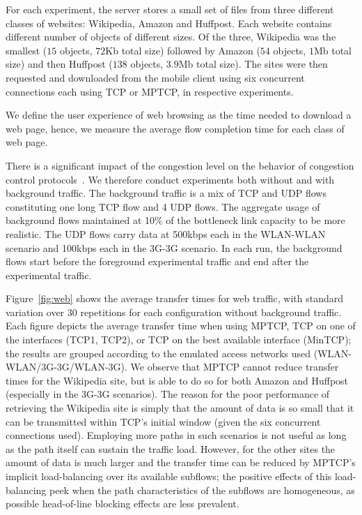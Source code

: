 For each experiment, the server stores a small set of files from three different classes
of websites: Wikipedia, Amazon and Huffpost. Each website contains different number of objects of different sizes. 
Of the three, Wikipedia was the smallest ($15$ objects, $72$Kb total size) followed by Amazon ($54$ objects, $1$Mb total size) 
and then Huffpost ($138$ objects, $3.9$Mb total size). The sites were then requested and downloaded from the mobile 
client using six concurrent connections each using TCP or MPTCP, in respective experiments.

We define the user experience of web browsing as the time needed to download a web page, hence, we measure the average flow completion time for each class of web page.

There is a significant impact of the congestion level on the behavior of congestion control protocols~\cite{ha-background-traffic-comnet-2007}. We therefore conduct
experiments both without and with background traffic.  The background traffic is a mix of TCP and UDP flows constituting one long TCP flow and 4 UDP flows. The
aggregate usage of background flows maintained at 10\% of the bottleneck link capacity to be more realistic. The UDP flows carry data at 500kbps each in the
WLAN-WLAN scenario and 100kbps each in the 3G-3G scenario.  In each run, the background flows start before the foreground experimental traffic and end after
the experimental traffic.


Figure~\ref{fig:web} shows the average transfer times for web traffic, with standard variation over $30$ repetitions for 
each configuration without background traffic. Each figure depicts the average transfer time when using MPTCP, 
TCP on one of the interfaces (TCP1, TCP2), or TCP on the best available interface (MinTCP); the results are grouped according
to the emulated access networks used (WLAN-WLAN/3G-3G/WLAN-3G). We observe that MPTCP cannot reduce transfer times for the Wikipedia site, 
but is able to do so for both Amazon and Huffpost (especially in the 3G-3G scenarios). The reason for the poor performance of retrieving 
the Wikipedia site is simply that the amount of data is so small that it can be transmitted within TCP's initial window (given the six concurrent connections used).
Employing more paths in such scenarios is not useful as long as the path itself can sustain the traffic load. However, for the other sites the amount of data is
much larger and the transfer time can be reduced by MPTCP's implicit load-balancing over its available subflows; the positive effects of this load-balancing peek
when the path characteristics of the subflows are homogeneous, as possible head-of-line blocking effects are less prevalent.


